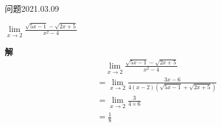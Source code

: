 \begin{mybox}{问题2021.03.09}
	
	\qquad $\lim\limits_{x \to 2}\frac{\sqrt{5x-1}-\sqrt{2x+5}}{x^2-4}$
\end{mybox}
\noindent
\textbf{解}
\begin{align*}
	&\quad \lim\limits_{x \to 2}\frac{\sqrt{5x-1}-\sqrt{2x+5}}{x^2-4}\\
	&=\lim\limits_{x \to 2}\frac{3x-6}{4(x-2)(\sqrt{5x-1}+\sqrt{2x+5})}\\
	&=\lim\limits_{x \to 2} \frac{3}{4\times 6}\\
	&=\frac{1}{8}
\end{align*}